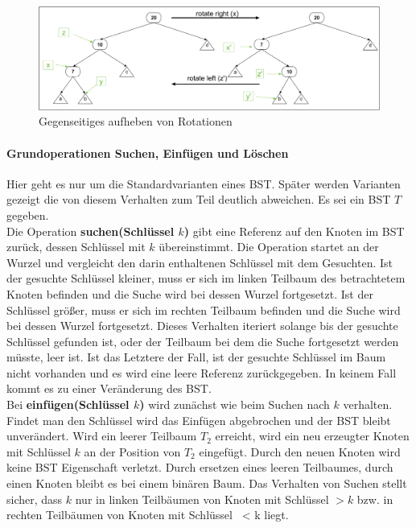 \documentclass[a4paper,12pt]{article}
\begin{document}
\begin{figure}[h]
	\centering
	\includegraphics[width= 1.2\textwidth]{"Medien/Einleitung/LinksRechtsRotation"}
	\caption{Gegenseitiges aufheben von Rotationen}
	\label{fig:LinksRechtsRotation}
\end{figure}

\paragraph{Grundoperationen Suchen, Einfügen und Löschen} \label{BST Operationen}
Hier geht es nur um die Standardvarianten eines BST. Später werden Varianten gezeigt die von diesem Verhalten zum Teil deutlich abweichen. Es sei ein BST $T$ gegeben.\\
  Die Operation \textbf{suchen(Schlüssel $k$)} gibt eine Referenz auf den Knoten im BST zurück, dessen Schlüssel mit $k$ übereinstimmt. Die Operation startet an der Wurzel und vergleicht den darin enthaltenen Schlüssel mit dem Gesuchten. Ist der gesuchte Schlüssel kleiner, muss er sich im linken Teilbaum des betrachtetem Knoten befinden und die Suche wird bei dessen Wurzel fortgesetzt. Ist der Schlüssel größer, muss er sich im rechten Teilbaum befinden und die Suche wird bei dessen Wurzel fortgesetzt. Dieses Verhalten iteriert solange bis der gesuchte Schlüssel gefunden ist, oder der Teilbaum bei dem die Suche fortgesetzt werden müsste, leer ist. Ist das Letztere der Fall, ist der gesuchte Schlüssel im Baum nicht vorhanden und es wird eine leere Referenz zurückgegeben. In keinem Fall kommt es zu einer Veränderung des BST.\\
  Bei \textbf{einfügen(Schlüssel $k$)} wird zunächst wie beim Suchen nach $k$ verhalten. Findet man den Schlüssel wird das Einfügen abgebrochen und der BST bleibt unverändert. Wird ein leerer Teilbaum $T_2$ erreicht, wird ein neu erzeugter Knoten mit Schlüssel $k$ an der Position von $T_2$ eingefügt. Durch den neuen Knoten wird keine BST Eigenschaft verletzt. Durch ersetzen eines leeren Teilbaumes, durch einen Knoten bleibt es bei einem binären Baum. Das Verhalten von Suchen stellt sicher, dass $k$ nur in linken Teilbäumen von Knoten mit Schlüssel $> k$ bzw. in rechten Teilbäumen von Knoten mit Schlüssel~ < k liegt.    \\
\end{document}
